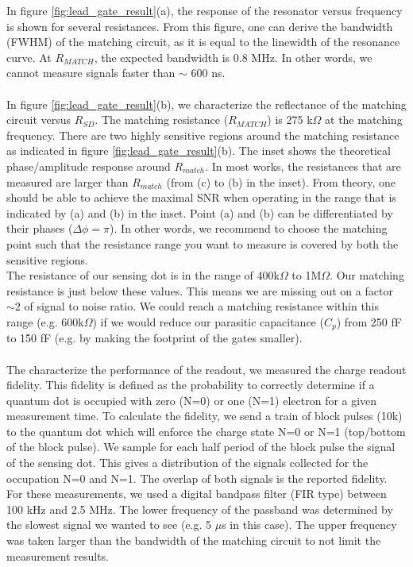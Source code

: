 \documentclass{article}
\begin{document}
	In figure \ref{fig:lead_gate_result}(a), the response of the resonator versus frequency is shown for several resistances. From this figure, one can derive the bandwidth (FWHM) of the matching circuit, as it is equal to the linewidth of the resonance curve. At $R_{MATCH}$, the expected bandwidth is 0.8 MHz. In other words, we cannot measure signals faster than $\sim$ 600 ns.
	\\ \\
	In figure \ref{fig:lead_gate_result}(b), we characterize the reflectance of the matching circuit versus $R_{SD}$. The matching resistance ($R_{MATCH}$) is 275 k$\Omega$ at the matching frequency. There are two highly sensitive regions around the matching resistance as indicated in figure \ref{fig:lead_gate_result}(b). The inset shows the theoretical phase/amplitude response around $R_{match}$. In most works, the resistances that are measured are larger than $R_{match}$ (from (c) to (b) in the inset).
	From theory, one should be able to achieve the maximal SNR when operating in the range that is indicated by (a) and (b) in the inset. Point (a) and (b) can be differentiated by their phases ($\Delta \phi = \pi$). In other words, we recommend to choose the matching point such that the resistance range you want to measure is covered by both the sensitive regions. \\
	The resistance of our sensing dot is in the range of 400k$\Omega$ to 1M$\Omega$. Our matching resistance is just below these values. This means we are missing out on a factor $\sim2$ of signal to noise ratio. We could reach a matching resistance within this range (e.g. 600k$\Omega$) if we would reduce our parasitic capacitance ($C_p$) from 250 fF to 150 fF (e.g. by making the footprint of the gates smaller).
	\\ \\
	The characterize the performance of the readout, we measured the charge readout fidelity. This fidelity is defined as the probability to correctly determine if a quantum dot is occupied with zero (N=0) or one (N=1) electron for a given measurement time. To calculate the fidelity, we send a train of block pulses (10k) to the quantum dot which will enforce the charge state N=0 or N=1 (top/bottom of the block pulse). We sample for each half period of the block pulse the signal of the sensing dot. This gives a distribution of the signals collected for the occupation N=0 and N=1. The overlap of both signals is the reported fidelity. For these measurements, we used a digital bandpass filter (FIR type) between 100 kHz and 2.5 MHz. The lower frequency of the passband was determined by the slowest signal we wanted to see (e.g. 5 $\mu$s in this case). The upper frequency was taken larger than the bandwidth of the matching circuit to not limit the measurement results.
\end{document}
